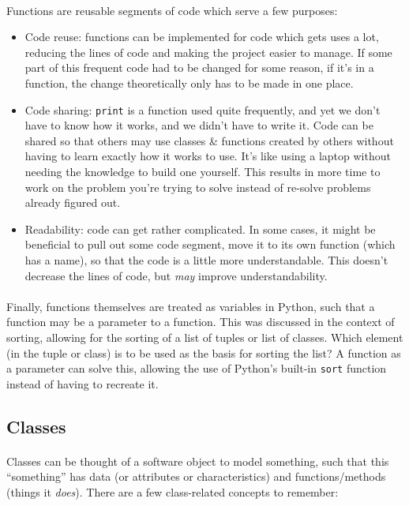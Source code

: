 \documentclass[letter,10pt]{article}
\begin{document}
\paragraph{}Functions are reusable segments of code which serve a few purposes:
\begin{itemize}
    \item Code reuse: functions can be implemented for code which gets uses a lot, reducing the lines of code and making the project easier to manage. If some part of this frequent code had to be changed for some reason, if it's in a function, the change theoretically only has to be made in one place.
    \item Code sharing: \verb|print| is a function used quite frequently, and yet we don't have to know how it works, and we didn't have to write it. Code can be shared so that others may use classes \& functions created by others without having to learn exactly how it works to use. It's like using a laptop without needing the knowledge to build one yourself. This results in more time to work on the problem you're trying to solve instead of re-solve problems already figured out.
    \item Readability: code can get rather complicated. In some cases, it might be beneficial to pull out some code segment, move it to its own function (which has a name), so that the code is a little more understandable. This doesn't decrease the lines of code, but \textit{may} improve understandability.
\end{itemize}

\paragraph{}Finally, functions themselves are treated as variables in Python, such that a function may be a parameter to a function. This was discussed in the context of sorting, allowing for the sorting of a list of tuples or list of classes. Which element (in the tuple or class) is to be used as the basis for sorting the list? A function as a parameter can solve this, allowing the use of Python's built-in \verb|sort| function instead of having to recreate it.

\subsection{Classes}
\paragraph{}Classes can be thought of a software object to model something, such that this ``something'' has data (or attributes or characteristics) and functions/methods (things it \textit{does}). There are a few class-related concepts to remember:
\end{document}

